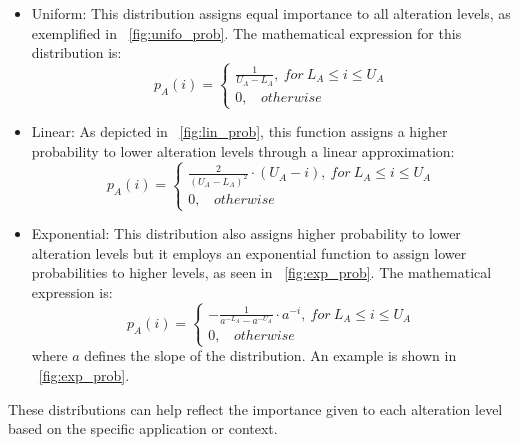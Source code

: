 \begin{itemize}
	\item Uniform: This distribution assigns equal importance to all alteration levels, as exemplified in \Fig~\ref{fig:unifo_prob}. The mathematical expression for this distribution is:
	\[
		p_A(i) = \begin{cases}
			\frac{1}{U_A - L_A}, \ for \ L_A \le i \le U_A\\
			0, \ \ \ \ otherwise
		\end{cases}
	\]
	\item Linear: As depicted in \Fig~\ref{fig:lin_prob}, this function assigns a higher probability to lower alteration levels through a linear approximation:
	\[
		p_A(i) = \begin{cases}
			\frac{2}{(U_A - L_A)^2}\cdot (U_A - i), \ for \ L_A \le i \le U_A\\
			0, \ \ \ \ otherwise
		\end{cases}
	\] 
	\item Exponential: This distribution also assigns higher probability to lower alteration levels but it employs an exponential function to assign lower probabilities to higher levels, as seen in \Fig~\ref{fig:exp_prob}. The mathematical expression is:
	\[
		p_A(i) = \begin{cases}
			-\frac{1}{a^{-L_A} - a^{-U_A}}\cdot a^{-i}, \ for \ L_A \le i \le U_A\\
			0, \ \ \ \ otherwise
		\end{cases}
	\]
	where $a$ defines the slope of the distribution. An example is shown in \Fig~\ref{fig:exp_prob}.
\end{itemize}

These distributions can help reflect the importance given to each alteration level based on the specific application or context.

